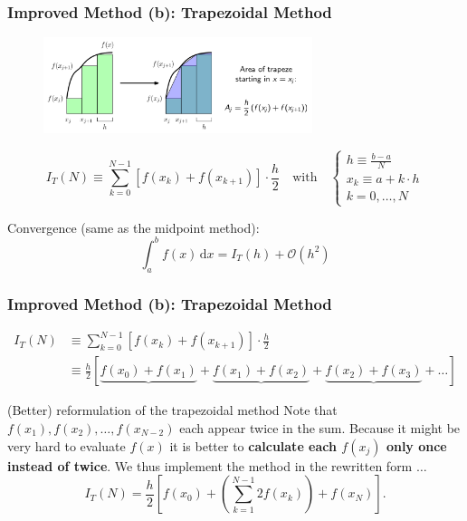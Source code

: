 \documentclass[11pt,aspectratio=169,handout]{beamer}
\begin{document}
\begin{frame}
	\frametitle{Improved Method (b): Trapezoidal Method}
	\begin{figure}
		\centering
		\includegraphics[width=0.7\textwidth]{fig/integration-trapez-with-text}
	\end{figure}
	\pause
	\begin{equation*}
		I_T(N) \equiv  \sum_{k=0}^{N-1} \left[ f(x_k)+f(x_{k+1}) \right] \cdot \frac{h}{2}  \quad \text{with} \quad
		\begin{cases}
			h \equiv \frac{b-a}{N} \\
			x_k \equiv a + k \cdot h \\
			k = 0, \ldots, N
		\end{cases}
	\end{equation*}
	
	\pause
	
	Convergence (same as the midpoint method):
	\begin{equation*}
		\int_a^b f(x) \, \mathrm{d}x = I_T(h) + \mathcal{O}\left(h^2\right)
	\end{equation*}
	
\end{frame}


\begin{frame}
	\frametitle{Improved Method (b): Trapezoidal Method}
	\begin{align*}
		I_T(N) & \equiv  \sum_{k=0}^{N-1} \left[ f(x_k)+f(x_{k+1}) \right] \cdot \frac{h}{2} \\
		& \equiv \frac{h}{2}\left[\underbrace{f(x_0) + f(x_1)} + \underbrace{f(x_1) + f(x_2)} + \underbrace{f(x_2) + f(x_3)} + \ldots \right]
	\end{align*}
	\begin{block}{(Better) reformulation of the trapezoidal method}
		Note that $f(x_1), f(x_2), \ldots, f(x_{N-2})$ each appear twice in the sum. Because it might be very hard to evaluate $f(x)$  it is better to \textbf{calculate each $f(x_j)$ only once instead of twice}. We thus implement the method in the rewritten form $\ldots$
		\begin{equation*}
			I_T(N) = \frac{h}{2} \left[ f(x_0) + \left(\sum_{k=1}^{N-1}  2f(x_k)\right)+f(x_{N}) \right] \mathrm{.}
		\end{equation*}
	\end{block}
	
\end{frame}
\end{document}
